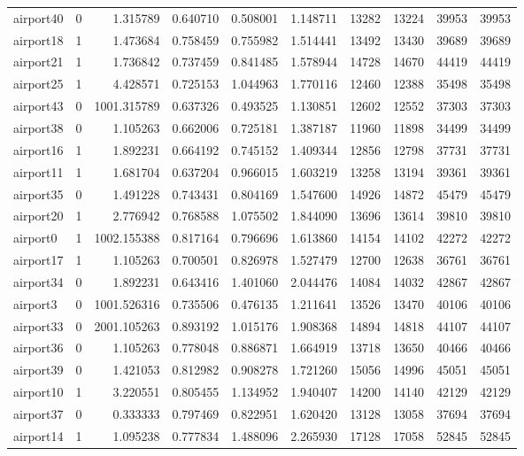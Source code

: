 \begin{longtable}{|l|r|r|r|r|r|r|r|r|r|}
airport40 & 0 & 1.315789 & 0.640710 & 0.508001 & 1.148711 & 13282 & 13224 & 39953 & 39953 \\
airport18 & 1 & 1.473684 & 0.758459 & 0.755982 & 1.514441 & 13492 & 13430 & 39689 & 39689 \\
airport21 & 1 & 1.736842 & 0.737459 & 0.841485 & 1.578944 & 14728 & 14670 & 44419 & 44419 \\
airport25 & 1 & 4.428571 & 0.725153 & 1.044963 & 1.770116 & 12460 & 12388 & 35498 & 35498 \\
airport43 & 0 & 1001.315789 & 0.637326 & 0.493525 & 1.130851 & 12602 & 12552 & 37303 & 37303 \\
airport38 & 0 & 1.105263 & 0.662006 & 0.725181 & 1.387187 & 11960 & 11898 & 34499 & 34499 \\
airport16 & 1 & 1.892231 & 0.664192 & 0.745152 & 1.409344 & 12856 & 12798 & 37731 & 37731 \\
airport11 & 1 & 1.681704 & 0.637204 & 0.966015 & 1.603219 & 13258 & 13194 & 39361 & 39361 \\
airport35 & 0 & 1.491228 & 0.743431 & 0.804169 & 1.547600 & 14926 & 14872 & 45479 & 45479 \\
airport20 & 1 & 2.776942 & 0.768588 & 1.075502 & 1.844090 & 13696 & 13614 & 39810 & 39810 \\
airport0 & 1 & 1002.155388 & 0.817164 & 0.796696 & 1.613860 & 14154 & 14102 & 42272 & 42272 \\
airport17 & 1 & 1.105263 & 0.700501 & 0.826978 & 1.527479 & 12700 & 12638 & 36761 & 36761 \\
airport34 & 0 & 1.892231 & 0.643416 & 1.401060 & 2.044476 & 14084 & 14032 & 42867 & 42867 \\
airport3 & 0 & 1001.526316 & 0.735506 & 0.476135 & 1.211641 & 13526 & 13470 & 40106 & 40106 \\
airport33 & 0 & 2001.105263 & 0.893192 & 1.015176 & 1.908368 & 14894 & 14818 & 44107 & 44107 \\
airport36 & 0 & 1.105263 & 0.778048 & 0.886871 & 1.664919 & 13718 & 13650 & 40466 & 40466 \\
airport39 & 0 & 1.421053 & 0.812982 & 0.908278 & 1.721260 & 15056 & 14996 & 45051 & 45051 \\
airport10 & 1 & 3.220551 & 0.805455 & 1.134952 & 1.940407 & 14200 & 14140 & 42129 & 42129 \\
airport37 & 0 & 0.333333 & 0.797469 & 0.822951 & 1.620420 & 13128 & 13058 & 37694 & 37694 \\
airport14 & 1 & 1.095238 & 0.777834 & 1.488096 & 2.265930 & 17128 & 17058 & 52845 & 52845 \\

\end{longtable}
